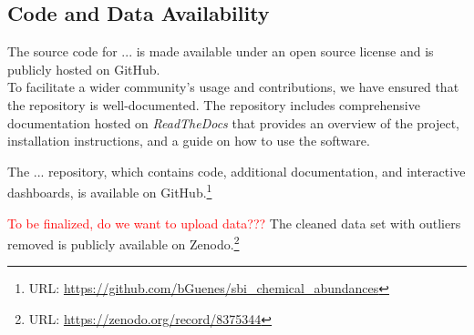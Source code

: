 \documentclass{aa}
\begin{document}
\begin{appendix}

\section{Code and Data Availability}
\label{sec:appendix_code_and_data}
The source code for ...  is made available under an open source license and is publicly hosted on GitHub.\\
To facilitate a wider community's usage and contributions, we have ensured that the repository is well-documented. The repository includes comprehensive documentation hosted on \emph{ReadTheDocs} that provides an overview of the project, installation instructions, and a guide on how to use the software. 

The ... repository, which contains code, additional documentation, and interactive dashboards, is available on GitHub.\footnote{URL: \url{https://github.com/bGuenes/sbi_chemical_abundances}}

\textcolor{red}{To be finalized, do we want to upload data???}
The cleaned data set with outliers removed is publicly available on Zenodo.\footnote{URL: \url{https://zenodo.org/record/8375344}}


   \end{appendix}
\end{document}
